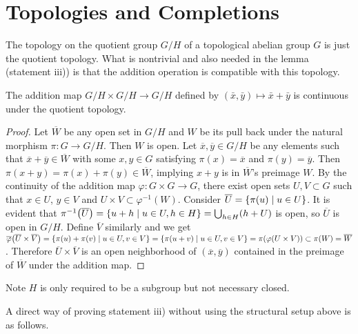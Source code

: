 \documentclass{note}
\begin{document}
\section*{Topologies and Completions}

The topology on the quotient group $G/H$ of a topological abelian group $G$ is
just the quotient topology. What is nontrivial and also needed in the lemma
(statement iii)) is that the addition operation is compatible with this
topology.

\begin{lemma*}
  The addition map $G/H \times G/H \to G/H$ defined by $(\bar{x},\bar{y}) \mapsto
    \bar{x}+\bar{y}$ is continuous under the quotient topology.
\end{lemma*}

\begin{proof}
  Let $\overline{W}$ be any open set in $G/H$ and $W$ be its pull back under the
  natural morphism $\pi\colon G \to G/H$. Then $W$ is open. Let $\overline{x},
    \overline{y} \in G/H$ be any elements such that $\overline{x} + \overline{y}
    \in \overline{W}$ with some $x, y \in G$ satisfying $\pi(x) = \overline{x}$ and
  $\pi(y) = \overline{y}$. Then $\pi(x + y) = \pi(x) + \pi(y) \in
    \overline{W}$,
  implying $x + y$ is in $\overline{W}$'s preimage $W$. By the continuity of the
  addition map $\varphi\colon G \times G \to G$, there exist open sets $U,V
    \subset G$ such that $x\in U$, $y\in V$ and $U\times V \subset
    \varphi^{-1}(W)$. Consider $\overline{U} = \setbuilder{\pi(u)}{u \in U}$. It is
  evident that $\pi^{-1}\left(\overline{U}\right) = \setbuilder{u+h}{u \in U, h
      \in H} =
    \bigcup_{h\in H}(h+U)$ is open, so $\overline{U}$ is open in $G/H$.
  Define $\overline{V}$ similarly and we get
  $\overline\varphi\left(\overline{U}\times\overline{V}\right) =
    \setbuilder{\pi(u)+\pi(v)}{u\in U, v\in V} = \setbuilder{\pi(u+v)}{u\in U, v\in
      V} = \pi\left(\varphi\left(U\times V\right)\right)
    \subset \pi(W) =
    \overline{W}$. Therefore $\overline{U} \times \overline{V}$ is an open
  neighborhood of $\left(\overline{x}, \overline{y}\right)$ contained in the
  preimage of $\overline{W}$ under the addition map.
\end{proof}

\begin{remark*}
  Note $H$ is only required to be a subgroup but not necessary closed.
\end{remark*}

A direct way of proving statement iii) without using the structural setup above
is as follows.
\end{document}
